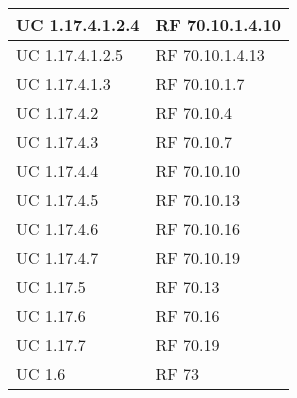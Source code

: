 {\begin{longtable} [c]{| p{4cm} | p{4cm} |}
 \hline 
UC 1.17.4.1.2.4 & RF 70.10.1.4.10\\ 
 \hline 
UC 1.17.4.1.2.5 & RF 70.10.1.4.13\\ 
 \hline 
UC 1.17.4.1.3 & RF 70.10.1.7\\ 
 \hline 
UC 1.17.4.2 & RF 70.10.4\\ 
 \hline 
UC 1.17.4.3 & RF 70.10.7\\ 
 \hline 
UC 1.17.4.4 & RF 70.10.10\\ 
 \hline 
UC 1.17.4.5 & RF 70.10.13\\ 
 \hline 
UC 1.17.4.6 & RF 70.10.16\\ 
 \hline 
UC 1.17.4.7 & RF 70.10.19\\ 
 \hline 
UC 1.17.5 & RF 70.13\\ 
 \hline 
UC 1.17.6 & RF 70.16\\ 
 \hline 
UC 1.17.7 & RF 70.19\\ 
 \hline 
UC 1.6 & RF 73\\ 
 \hline 
\end{longtable}}